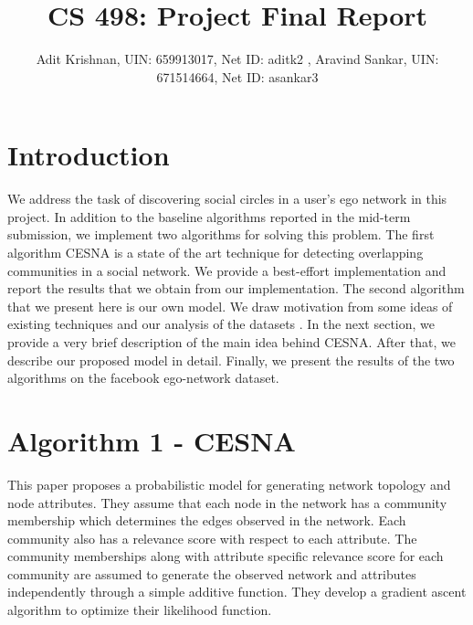 \documentclass[11pt]{article}
\begin{document}
 
 
 
\title{CS 498: Project Final Report}%
\author{Adit Krishnan, UIN: 659913017, Net ID: aditk2 , Aravind Sankar, UIN: 671514664, Net ID: asankar3 \\} %
\maketitle


\section{Introduction}
We address the task of discovering social circles in a user's ego network in this project. In addition to the baseline algorithms reported in the mid-term submission, we implement two algorithms for solving this problem. The first algorithm CESNA \cite{cesna} is a state of the art technique for detecting overlapping communities in a social network. We provide a best-effort implementation and report the results that we obtain from our implementation. The second algorithm that we present here is our own model. We draw motivation from some ideas of existing techniques and our analysis of the datasets \cite{SNAP dataset}. 
In the next section, we provide a very brief description of the main idea behind CESNA. 
After that, we describe our proposed model in detail. Finally, we present the results of the two algorithms on the facebook ego-network dataset.

\section{Algorithm 1 - CESNA}
This paper proposes a probabilistic model for generating network topology and node attributes. They assume that each node in the network has a community membership which determines the edges observed in the network. Each community also has a relevance score with respect to each attribute. The community memberships along with attribute specific relevance score for each community are assumed to generate the observed network and attributes independently through a simple additive function. They develop a gradient ascent algorithm to optimize their likelihood function.
\end{document}
